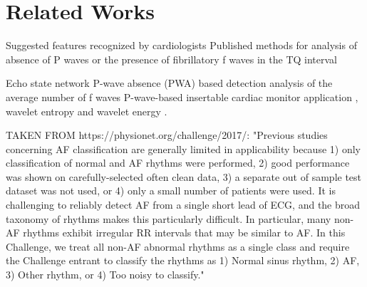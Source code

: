 \section{Related Works}


Suggested features recognized by cardiologists \cite{reiffel2010practice}
Published methods for analysis of absence of P waves or the presence of fibrillatory f waves in the TQ interval

Echo state network \cite{petrenas2012echo}
P-wave absence (PWA) based detection \cite{ladavich2015rate}
analysis of the average number of f waves \cite{du2014novel}
P-wave-based insertable cardiac monitor application \cite{purerfellner2014p},
wavelet entropy \cite{alcaraz2006wavelet} \cite{rodenas2015wavelet} and wavelet energy \cite{garcia2016application}.

TAKEN FROM https://physionet.org/challenge/2017/:
"Previous studies concerning AF classification are generally limited in applicability because 1) only classification of normal and AF rhythms were performed, 2) good performance was shown on carefully-selected often clean data, 3) a separate out of sample test dataset was not used, or 4) only a small number of patients were used. It is challenging to reliably detect AF from a single short lead of ECG, and the broad taxonomy of rhythms makes this particularly difficult. In particular, many non-AF rhythms exhibit irregular RR intervals that may be similar to AF. In this Challenge, we treat all non-AF abnormal rhythms as a single class and require the Challenge entrant to classify the rhythms as 1) Normal sinus rhythm, 2) AF, 3) Other rhythm, or 4) Too noisy to classify."
